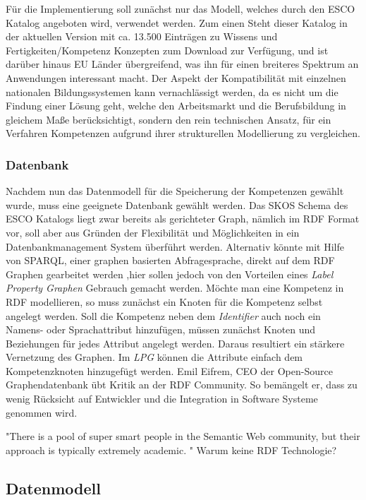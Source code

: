  Für die Implementierung soll zunächst nur das Modell, welches durch den ESCO Katalog angeboten wird, verwendet werden. Zum einen Steht dieser Katalog in der aktuellen Version mit ca. 13.500 Einträgen zu Wissens und Fertigkeiten/Kompetenz Konzepten zum Download zur Verfügung, und ist darüber hinaus EU Länder übergreifend, was ihn für einen breiteres Spektrum an Anwendungen interessant macht. 
 Der Aspekt der Kompatibilität mit einzelnen nationalen Bildungssystemen kann vernachlässigt werden, da es nicht um die Findung einer Lösung geht, welche den Arbeitsmarkt und die Berufsbildung in gleichem Maße berücksichtigt, sondern den rein technischen Ansatz, für ein Verfahren Kompetenzen aufgrund ihrer strukturellen Modellierung zu vergleichen. 
 


\subsubsection{Datenbank}

Nachdem nun das Datenmodell für die Speicherung der Kompetenzen gewählt wurde, muss eine geeignete Datenbank gewählt werden. Das SKOS Schema des ESCO Katalogs liegt zwar bereits als gerichteter Graph, nämlich im RDF Format vor, soll aber aus Gründen der Flexibilität und Möglichkeiten in ein Datenbankmanagement System überführt werden.
Alternativ könnte mit Hilfe von SPARQL, einer graphen basierten Abfragesprache, direkt auf dem RDF Graphen gearbeitet werden 
,hier sollen jedoch von den Vorteilen eines \textit{Label Property Graphen}  Gebrauch gemacht werden. Möchte man eine Kompetenz in RDF modellieren, so muss zunächst ein Knoten für die Kompetenz selbst angelegt werden. Soll die Kompetenz neben dem \textit{Identifier} auch noch ein Namens- oder Sprachattribut hinzufügen, müssen zunächst Knoten und Beziehungen für jedes Attribut angelegt werden. Daraus resultiert ein stärkere Vernetzung des Graphen. Im \textit{LPG} können die Attribute einfach dem Kompetenzknoten hinzugefügt werden. Emil Eifrem, CEO der Open-Source Graphendatenbank \cite{Neo4j} übt Kritik an der RDF Community. So bemängelt er, dass zu wenig Rücksicht auf Entwickler und die Integration in Software Systeme genommen wird. \cite{anadiotis_2017} \newline

"There is a pool of super smart people in the Semantic Web community, but their approach is typically extremely academic. "
Warum keine RDF Technologie?

\subsection{Datenmodell}

